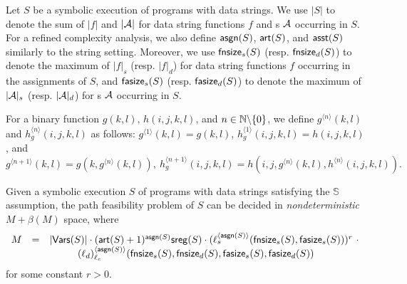 Let $S$ be a symbolic execution of programs with data strings.  We use $|S|$ to denote the sum of $|f|$ and $|\mathcal{A}|$ for data string functions $f$ and \SA{}s $\mathcal{A}$ occurring in $S$.  
For a refined complexity analysis, we also define $\mathsf{asgn}(S)$, $\mathsf{art}(S)$, and $\mathsf{asst}(S)$ similarly to the string setting. Moreover, we use $\mathsf{fnsize}_s(S)$ (resp. $\mathsf{fnsize}_d(S)$) to denote the maximum of $|f|_s$ (resp. $|f|_d$) for data string functions $f$ occurring in the assignments of $S$, and $\mathsf{fasize}_s(S)$ (resp. $\mathsf{fasize}_d(S)$) to denote the maximum of $|\mathcal{A}|_s$ (resp. $|\mathcal{A}|_d$) for \SA{}s $\mathcal{A}$ occurring in $S$.





For a binary function $g(k, l)$, $h(i, j, k, l)$, and $n \in \mathbb{N} \backslash \{0\}$, we define $g^{\langle n \rangle}(k, l)$ and $h^{\langle n \rangle}_g(i, j, k, l)$ as follows: $g^{\langle 1 \rangle}( k, l) = g(k, l)$, $h^{\langle 1 \rangle}_g(i, j, k, l) = h(i, j, k, l)$, and 
$$g^{\langle n+1 \rangle}( k, l) = g(k, g^{\langle n \rangle}( k, l)), \ h^{\langle n+1 \rangle}_g (i, j, k, l) = h(i, j, g^{\langle n \rangle}(k, l), h^{\langle n \rangle}(i, j, k, l)).$$


\begin{theorem}\label{thm-generic-dec-symbolic}
	Given a symbolic execution  $S$ of programs with data strings satisfying the $\mathbb{S}$\prerec{} assumption, the path feasibility problem of $S$ can be decided in \emph{nondeterministic} $M+ \beta(M)$ space, where  
	\[
	\begin{array}{l c l}
		M & = & |\mathsf{Vars}(S)| \cdot (\mathsf{art}(S)+1)^{\mathsf{asgn}(S)}  \mathsf{sreg}(S) \cdot  (\ell_s^{\langle \mathsf{asgn}(S) \rangle}(\mathsf{fnsize}_s(S), \mathsf{fasize}_s(S)))^{r}\ \cdot \\
		& &  \hspace{1cm} (\ell_d)^{\langle  \mathsf{asgn}(S) \rangle}_{\ell_c}(\mathsf{fnsize}_s(S),\mathsf{fnsize}_d(S),  \mathsf{fasize}_s(S), \mathsf{fasize}_d(S))
\end{array}
	\]
for some constant $r > 0$. 
\end{theorem}



